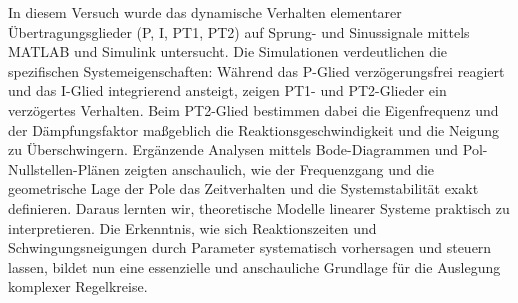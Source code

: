 In diesem Versuch wurde das dynamische Verhalten elementarer Übertragungsglieder (P, I, PT1, PT2) auf Sprung- und Sinussignale mittels MATLAB und Simulink untersucht.
Die Simulationen verdeutlichen die spezifischen Systemeigenschaften: Während das P-Glied verzögerungsfrei reagiert und das I-Glied integrierend ansteigt, zeigen PT1- und PT2-Glieder ein verzögertes Verhalten. Beim PT2-Glied bestimmen dabei die Eigenfrequenz und der Dämpfungsfaktor maßgeblich die Reaktionsgeschwindigkeit und die Neigung zu Überschwingern. Ergänzende Analysen mittels Bode-Diagrammen und Pol-Nullstellen-Plänen zeigten anschaulich, wie der Frequenzgang und die geometrische Lage der Pole das Zeitverhalten und die Systemstabilität exakt definieren.
Daraus lernten wir, theoretische Modelle linearer Systeme praktisch zu interpretieren. Die Erkenntnis, wie sich Reaktionszeiten und Schwingungsneigungen durch Parameter systematisch vorhersagen und steuern lassen, bildet nun eine essenzielle und anschauliche Grundlage für die Auslegung komplexer Regelkreise.

